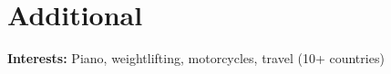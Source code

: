 \documentclass[letterpaper,11pt]{article}
\begin{document}
\section{Additional}
\begin{itemize}[leftmargin=0.15in, label={}, topsep=3pt, itemsep=0pt]
  \small{\item{
    \textbf{Interests:} Piano, weightlifting, motorcycles, travel (10+ countries)
  }}
\end{itemize}
\end{document}
